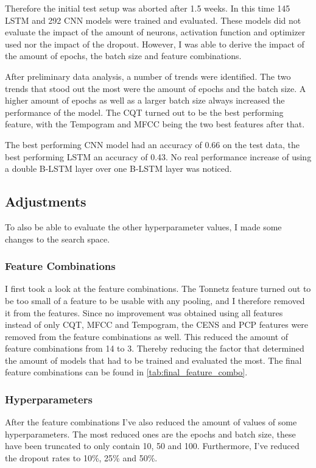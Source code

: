 Therefore the initial test setup was aborted after 1.5 weeks. In this time 145 LSTM and 292 CNN models were trained and evaluated. These models did not evaluate the impact of the amount of neurons, activation function and optimizer used nor the impact of the dropout. However, I was able to derive the impact of the amount of epochs, the batch size and feature combinations.

After preliminary data analysis, a number of trends were identified. The two trends that stood out the most were the amount of epochs and the batch size. A higher amount of epochs as well as a larger batch size always increased the performance of the model. The CQT turned out to be the best performing feature, with the Tempogram and MFCC being the two best features after that.   

The best performing CNN model had an accuracy of 0.66 on the test data, the best performing LSTM an accuracy of 0.43. No real performance increase of using a double B-LSTM layer over one B-LSTM layer was noticed.

\subsection{Adjustments}
To also be able to evaluate the other hyperparameter values, I made some changes to the search space.

\subsubsection{Feature Combinations}

I first took a look at the feature combinations. The Tonnetz feature turned out to be too small of a feature to be usable with any pooling, and I therefore removed it from the features. Since no improvement was obtained using all features instead of only CQT, MFCC and Tempogram, the CENS and PCP features were removed from the feature combinations as well. This reduced the amount of feature combinations from 14 to 3. Thereby reducing the factor that determined the amount of models that had to be trained and evaluated the most. The final feature combinations can be found in \autoref{tab:final_feature_combo}.

\subsubsection{Hyperparameters}
After the feature combinations I've also reduced the amount of values of some hyperparameters. The most reduced ones are the epochs and batch size, these have been truncated to only contain 10, 50 and 100. Furthermore, I've reduced the dropout rates to 10\%, 25\% and 50\%. 

